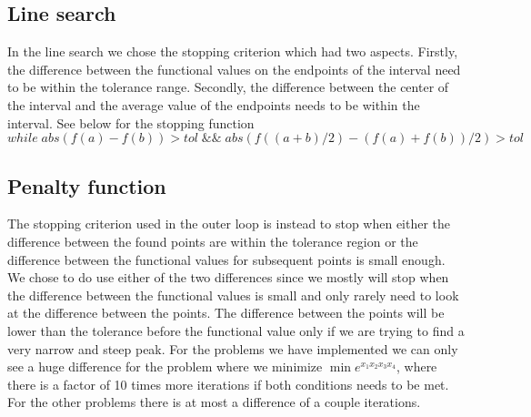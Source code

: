 \subsection{Line search}
In the line search we chose the stopping criterion which had two aspects. Firstly, the difference between the functional values on the endpoints of the interval need to be within the tolerance range. Secondly, the difference between the center of the interval and the average value of the endpoints needs to be within the interval. See below for the stopping function
$$ while\; abs(f(a)-f(b)) > tol\; \&\&\;abs(f((a+b)/2)-(f(a)+f(b))/2) > tol$$

\subsection{Penalty function}
The stopping criterion used in the outer loop is instead to stop when either the difference between the found points are within the tolerance region or the difference between the functional values for subsequent points is small enough. We chose to do use either of the two differences since we mostly will stop when the difference between the functional values is small and only rarely need to look at the difference between the points. The difference between the points will be lower than the tolerance before the functional value only if we are trying to find a very narrow and steep peak. For the problems we have implemented we can only see a huge difference for the problem where we minimize $\min e^{x_1 x_2 x_3 x_4} $, where there is a factor of 10 times more iterations if both conditions needs to be met. For the other problems there is at most a difference of a couple iterations.